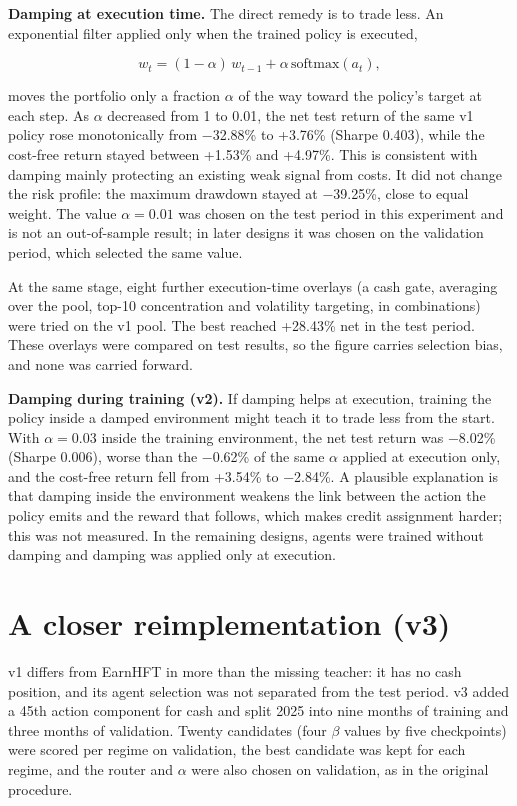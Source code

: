 \documentclass[12pt,a4paper]{report}
\newcounter{none} %
\begin{document}
\textbf{Damping at execution time.} The direct remedy is to trade less.
An exponential filter applied only when the trained policy is executed,

\[w_t = (1-\alpha)\,w_{t-1} + \alpha\,\mathrm{softmax}(a_t),\]

moves the portfolio only a fraction \(\alpha\) of the way toward the
policy's target at each step. As \(\alpha\) decreased from 1 to 0.01,
the net test return of the same v1 policy rose monotonically from
−32.88\% to +3.76\% (Sharpe 0.403), while the cost-free return stayed
between +1.53\% and +4.97\%. This is consistent with damping mainly
protecting an existing weak signal from costs. It did not change the
risk profile: the maximum drawdown stayed at −39.25\%, close to equal
weight. The value \(\alpha=0.01\) was chosen on the test period in this
experiment and is not an out-of-sample result; in later designs it was
chosen on the validation period, which selected the same value.

At the same stage, eight further execution-time overlays (a cash gate,
averaging over the pool, top-10 concentration and volatility targeting,
in combinations) were tried on the v1 pool. The best reached +28.43\%
net in the test period. These overlays were compared on test results, so
the figure carries selection bias, and none was carried forward.

\textbf{Damping during training (v2).} If damping helps at execution,
training the policy inside a damped environment might teach it to trade
less from the start. With \(\alpha = 0.03\) inside the training
environment, the net test return was −8.02\% (Sharpe 0.006), worse than
the −0.62\% of the same \(\alpha\) applied at execution only, and the
cost-free return fell from +3.54\% to −2.84\%. A plausible explanation
is that damping inside the environment weakens the link between the
action the policy emits and the reward that follows, which makes credit
assignment harder; this was not measured. In the remaining designs,
agents were trained without damping and damping was applied only at
execution.

\section{A closer reimplementation
(v3)}\label{a-closer-reimplementation-v3}

v1 differs from EarnHFT in more than the missing teacher: it has no cash
position, and its agent selection was not separated from the test
period. v3 added a 45th action component for cash and split 2025 into
nine months of training and three months of validation. Twenty
candidates (four \(\beta\) values by five checkpoints) were scored per
regime on validation, the best candidate was kept for each regime, and
the router and \(\alpha\) were also chosen on validation, as in the
original procedure.
\end{document}
